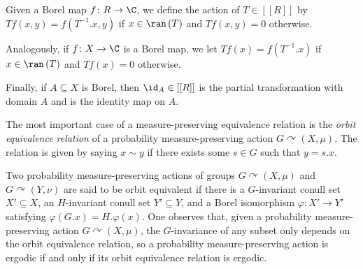 \documentclass[10pt]{mypackage}
\begin{document}
\begin{remark}
  Given a Borel map $f\colon R\rightarrow \C$, we define the action of $T\in \left[ \left[ R \right] \right]$ by $Tf\left( x,y \right) = f\left( T^{-1}.x,y \right)$ if $x\in \ran\left( T \right)$ and $Tf\left( x,y \right) = 0$ otherwise.

  Analogously, if $f\colon X\to \C$ is a Borel map, we let $Tf\left( x \right) = f\left( T^{-1}.x \right)$ if $x\in \ran\left( T \right)$ and $Tf\left( x \right) = 0$ otherwise.

  Finally, if $A\subseteq X$ is Borel, then $\id_A\in \left[ \left[ R \right] \right]$ is the partial transformation with domain $A$ and is the identity map on $A$.
\end{remark}
The most important case of a measure-preserving equivalence relation is the \textit{orbit equivalence relation} of a probability measure-preserving action $G\curvearrowright \left( X,\mu \right)$. The relation is given by saying $x\sim y$ if there exists some $s\in G$ such that $y = s.x$.

Two probability measure-preserving actions of groups $G\curvearrowright \left( X,\mu \right)$ and $G\curvearrowright \left( Y,\nu \right)$ are said to be orbit equivalent if there is a $G$-invariant conull set $X'\subseteq X$, an $H$-invariant conull set $Y'\subseteq Y$, and a Borel isomorphism $\varphi\colon X'\to Y'$ satisfying $\varphi\left( G.x \right) = H.\varphi(x)$. One observes that, given a probability measure-preserving action $G\curvearrowright \left( X,\mu \right)$, the $G$-invariance of any subset only depends on the orbit equivalence relation, so a probability measure-preserving action is ergodic if and only if its orbit equivalence relation is ergodic.
\end{document}
